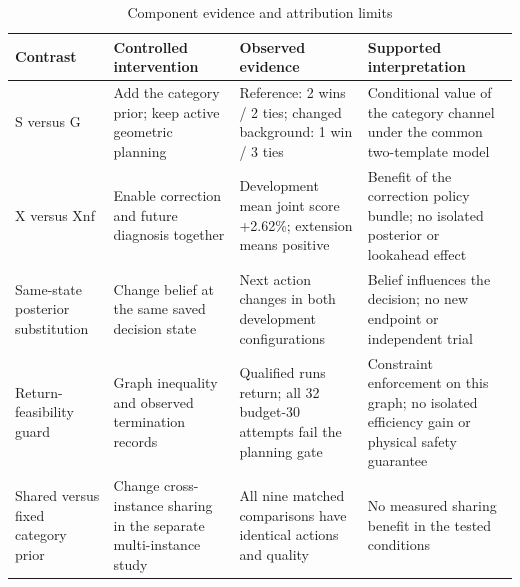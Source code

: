 \begin{table}[!htbp]
\caption{Component evidence and attribution limits}\label{tab:6}
\small\renewcommand{\arraystretch}{1.12}\setlength{\tabcolsep}{3pt}
\setlength{\JournalTableWidth}{\dimexpr\linewidth-6\tabcolsep\relax}
\begin{tabular}{@{}>{\raggedright\arraybackslash}p{0.22\JournalTableWidth} >{\raggedright\arraybackslash}p{0.24\JournalTableWidth} >{\raggedright\arraybackslash}p{0.24\JournalTableWidth} >{\raggedright\arraybackslash}p{0.3\JournalTableWidth}@{}}
\toprule
Contrast & Controlled intervention & Observed evidence & Supported interpretation \\
\midrule
S versus G & Add the category prior; keep active geometric planning & Reference: 2 wins / 2 ties; changed background: 1 win / 3 ties & Conditional value of the category channel under the common two-template model \\
X versus Xnf & Enable correction and future diagnosis together & Development mean joint score +2.62\%; extension means positive & Benefit of the correction policy bundle; no isolated posterior or lookahead effect \\
Same-state posterior substitution & Change belief at the same saved decision state & Next action changes in both development configurations & Belief influences the decision; no new endpoint or independent trial \\
Return-feasibility guard & Graph inequality and observed termination records & Qualified runs return; all 32 budget-30 attempts fail the planning gate & Constraint enforcement on this graph; no isolated efficiency gain or physical safety guarantee \\
Shared versus fixed category prior & Change cross-instance sharing in the separate multi-instance study & All nine matched comparisons have identical actions and quality & No measured sharing benefit in the tested conditions \\
\bottomrule
\end{tabular}
\end{table}
